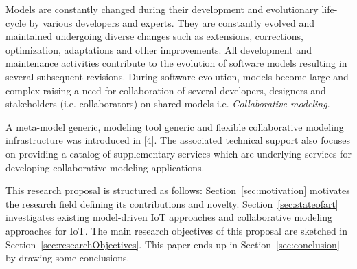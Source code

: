 Models are constantly changed during their development and evolutionary life-cycle by various developers and experts. They are constantly evolved and maintained undergoing diverse changes such as extensions, corrections, optimization, adaptations and other improvements. All development and maintenance activities contribute to the evolution of software models resulting in several subsequent revisions. During software evolution, models become large and complex raising a need for collaboration of several developers, designers and stakeholders (i.e. collaborators) on shared models i.e. \textit{Collaborative modeling}.

A meta-model generic, modeling tool generic and flexible collaborative modeling infrastructure was introduced in [4]. The associated technical support also focuses on providing a catalog of supplementary services which are underlying services for developing collaborative modeling applications.

This research proposal is structured as follows: Section~\ref{sec:motivation} motivates the research field defining its contributions and novelty. Section~\ref{sec:stateofart} investigates existing model-driven IoT approaches and collaborative modeling approaches for IoT. The main research objectives of this proposal are sketched in Section~\ref{sec:researchObjectives}. This paper ends up in Section~\ref{sec:conclusion} by drawing some conclusions.